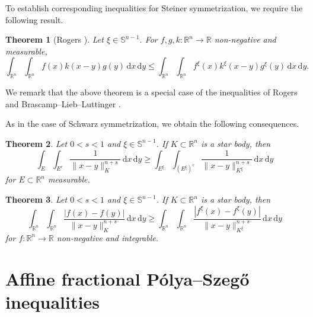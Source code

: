 \documentclass{amsart}
\newtheorem{theorem}{Theorem}
\newcommand{\snvtex}{{\mathbb S}^{n-1}}
\newcommand{\dvtex}{\,\mathrm{d}}
\begin{document}
To establish corresponding inequalities for Steiner symmetrization, we
require the following result.

\begin{theorem}[Rogers \cite{Rogers56}]
\label{thm_sBLL}
Let $\xi \in \snvtex $. For $f,g,k:\mathbb R^{n} \to \mathbb R$ non-negative
and measurable,
%
\begin{equation*}
\int _{\mathbb R^{n}}\int _{\mathbb R^{n}} f(x) k(x-y) g(y) \dvtex x \dvtex y
\leq \int _{\mathbb R^{n}}\int _{\mathbb R^{n}} f^{\xi}(x) k^{\xi}(x-y)
g^{\xi}(y) \dvtex x \dvtex y.
\end{equation*}
%
\end{theorem}

\noindent
We remark that the above theorem is a special case of the inequalities
of Rogers~\cite{Rogers57} and Brascamp--Lieb--Luttinger
\cite[Lemma~3.2]{BLL}.

\goodbreak
As in the case of Schwarz symmetrization, we obtain the following consequences.

\begin{theorem}%
\label{thm_perburchard_steiner}
Let $0<s<1$ and $\xi \in \snvtex $. If $K\subset \mathbb R^{n}$ is a star body,
then
%
\begin{equation}
\int _{E}\int _{E^{c}}\frac{1}{\|x-y\|^{n+s}_{K}} \dvtex x \dvtex y \geq
\int _{E^{\xi}}\int _{(E^{\xi})^{c}}
\frac{1}{\|x-y\|^{n+s}_{K^{\xi}}} \dvtex x \dvtex y
\nonumber \end{equation}
%
for $E\subset \mathbb R^{n}$ measurable.
\end{theorem}

\begin{theorem}%
\label{thm_fburchard_steiner}
Let $0<s<1$ and $\xi \in \snvtex $. If $K\subset \mathbb R^{n}$ is a star body,
then
%
\begin{equation}
\int _{\mathbb R^{n}} \int _{\mathbb R^{n}}
\frac{|f(x) - f(y)|}{\|x-y\|^{n+s}_{K}} \dvtex x \dvtex y \geq \int _{
\mathbb R^{n}} \int _{\mathbb R^{n}}
\frac{|f^{\xi}(x) - f^{\xi}(y)|}{\|x-y\|^{n+s}_{K^{\xi}}} \dvtex x \dvtex y
\nonumber \end{equation}
%
for $f :\mathbb R^{n} \to \mathbb R$ non-negative and integrable.
\end{theorem}

\section{Affine fractional P\'olya--Szeg\H o inequalities}
\label{sec_fracpettyproj}
\end{document}
